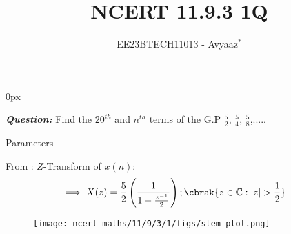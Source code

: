 \documentclass[journal,12pt,twocolumn]{IEEEtran}
\theoremstyle{remark}
\begin{document}
\parindent 0px

\vspace{3cm}

\title{NCERT 11.9.3 1Q}
\author{EE23BTECH11013 - Avyaaz$^{*}$%
}
\maketitle
\newpage
\bigskip

\renewcommand{\thefigure}{\arabic{figure}}
\renewcommand{\thetable}{\arabic{table}}
\large\textbf{\textsl{Question:}}
Find the $20^{th}$ and $n^{th}$ terms of the G.P $\frac{5}{2}$, $\frac{5}{4}$, $\frac{5}{8}$,.....

\solution
\fi
 \begin{table}[htbp]
     \centering
     \setlength{\extrarowheight}{8pt}
    
     \caption{Parameters}
     \label{tab:table1.11.9.3.1}
 \end{table} 


 
From :
\(Z\)-Transform of \(x(n)\):
\begin{align}
\implies X(z) &=\dfrac{5}{2}\left(\dfrac{1}{1-\frac{z^{-1}}{2}}\right) ;\cbrak{z\in\mathbb{C} : |z|>\dfrac{1}{2}}
\end{align}

\begin{figure}[ht]
    \centering
    \texttt{[image: ncert-maths/11/9/3/1/figs/stem\_plot.png]}
    \caption{}
	\label{fig:graph1.11.9.3.1}
\end{figure} 


\end{document}
